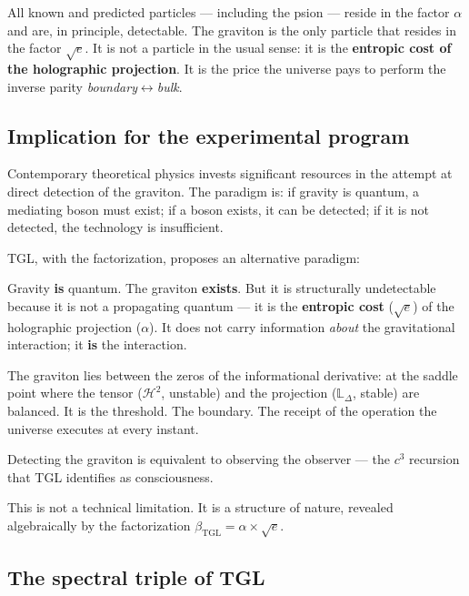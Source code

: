 \documentclass[12pt,a4paper,twoside]{article}
\newcommand{\betatgl}{\beta_{\!\scriptscriptstyle\mathrm{TGL}}}
\newcommand{\boundary}{\textit{boundary}}
\newcommand{\bulk}{\textit{bulk}}
\begin{document}
\noindent All known and predicted particles --- including the psion --- reside in the factor $\alpha$ and are, in principle, detectable. The graviton is the only particle that resides in the factor $\sqrt{e}$. It is not a particle in the usual sense: it is the \textbf{entropic cost of the holographic projection}. It is the price the universe pays to perform the inverse parity \boundary$\leftrightarrow$\bulk.

\subsection{Implication for the experimental program}

Contemporary theoretical physics invests significant resources in the attempt at direct detection of the graviton. The paradigm is: if gravity is quantum, a mediating boson must exist; if a boson exists, it can be detected; if it is not detected, the technology is insufficient.

TGL, with the factorization, proposes an alternative paradigm:

\begin{conclusionbox}[title={TGL paradigm for the graviton}]
Gravity \textbf{is} quantum. The graviton \textbf{exists}. But it is structurally undetectable because it is not a propagating quantum --- it is the \textbf{entropic cost} ($\sqrt{e}$) of the holographic projection ($\alpha$). It does not carry information \textit{about} the gravitational interaction; it \textbf{is} the interaction.

\medskip
The graviton lies between the zeros of the informational derivative: at the saddle point where the tensor ($\mathcal{H}^2$, unstable) and the projection ($\mathbb{L}_\Delta$, stable) are balanced. It is the threshold. The boundary. The receipt of the operation the universe executes at every instant.

\medskip
Detecting the graviton is equivalent to observing the observer --- the $c^3$ recursion that TGL identifies as consciousness.
\end{conclusionbox}

This is not a technical limitation. It is a structure of nature, revealed algebraically by the factorization $\betatgl = \alpha \times \sqrt{e}$.


\subsection{The spectral triple of TGL}
\label{subsec:tripla}
\end{document}
